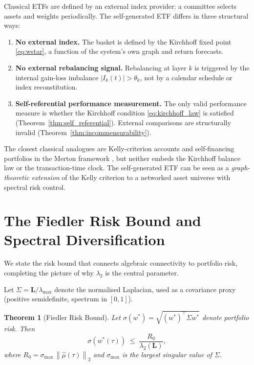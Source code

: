 \documentclass[twocolumn,11pt,a4paper]{article}
\theoremstyle{plain}
\newtheorem{theorem}{Theorem}[section]
\theoremstyle{definition}
\theoremstyle{remark}
\newcommand{\Lop}{\mathbf{L}}        %
\newcommand{\wstar}{w^{*}}
\newcommand{\lamtwo}{\lambda_2}
\newcommand{\lammax}{\lambda_{\max}}
\newcommand{\norm}[1]{\left\|#1\right\|}
\begin{document}
Classical ETFs are defined by an external index provider: a committee
selects assets and weights periodically.  The self-generated ETF differs
in three structural ways:

\begin{enumerate}[label=\textbf{\arabic*.}]
  \item \textbf{No external index.}  The basket is defined by the
        Kirchhoff fixed point \eqref{eq:wstar}, a function of the
        system's own graph and return forecasts.

  \item \textbf{No external rebalancing signal.}  Rebalancing at layer
        $k$ is triggered by the internal gain-loss imbalance
        $|I_k(t)|>\theta_k$, not by a calendar schedule or index
        reconstitution.

  \item \textbf{Self-referential performance measurement.}  The only
        valid performance measure is whether the Kirchhoff condition
        \eqref{eq:kirchhoff_law} is satisfied (Theorem~\ref{thm:self_referential}).
        External comparisons are structurally invalid
        (Theorem~\ref{thm:incommensurability}).
\end{enumerate}

The closest classical analogues are Kelly-criterion accounts
\cite{Kelly1956} and self-financing portfolios in the Merton framework
\cite{Merton1969}, but neither embeds the Kirchhoff balance law or
the transaction-time clock.  The self-generated ETF can be seen as a
\emph{graph-theoretic extension} of the Kelly criterion to a networked
asset universe with spectral risk control.

\section{The Fiedler Risk Bound and Spectral Diversification}
\label{sec:riskbound}

We state the risk bound that connects algebraic connectivity to
portfolio risk, completing the picture of why $\lamtwo$ is the central
parameter.

Let $\Sigma=\Lop/\lammax$ denote the normalised Laplacian, used as a
covariance proxy (positive semidefinite, spectrum in $[0,1]$).

\begin{theorem}[Fiedler Risk Bound]
  \label{thm:riskbound}
  Let $\sigma(\wstar)=\sqrt{(\wstar)^{\top}\Sigma\wstar}$ denote
  portfolio risk.  Then
  \begin{equation}
    \sigma(\wstar(\tau))
    \;\le\; \frac{R_0}{\lamtwo(\Lop)},
    \label{eq:risk_bound}
  \end{equation}
  where $R_0=\sigma_{\max}\,\norm{\hat\mu(\tau)}_2$ and $\sigma_{\max}$
  is the largest singular value of $\Sigma$.
\end{theorem}
\end{document}
